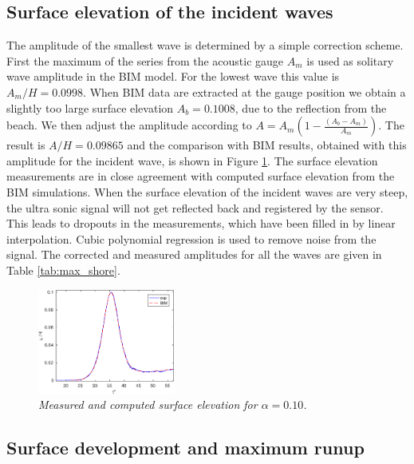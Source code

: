 \documentclass[review, authoryear]{elsarticle}
\begin{document}
\subsection{Surface elevation of the incident waves}
\label{surf_elev}
The amplitude of the smallest wave is determined by
a simple correction scheme. First the maximum of the series from the 
acoustic gauge $A_m$ is used as solitary wave amplitude in the BIM model.
For the lowest wave this value is $A_m/H=0.0998$.
When BIM data are extracted at the gauge position we obtain 
a slightly too large surface elevation $A_b=0.1008$, due to the reflection from 
the beach. We then adjust the amplitude 
according to $A=A_m (1- \frac{ (A_b-A_m)}{A_m})$. 
The result is $A/H=0.09865$ and the comparison with BIM results, obtained with this amplitude for the incident wave, is shown in Figure \ref{fig:surf_ele1}.
The surface elevation measurements are in close agreement with computed surface elevation from the BIM simulations. 
When the surface elevation of the incident waves are very steep, the ultra sonic signal will not get reflected back and registered by the sensor. 
This leads to dropouts in the measurements, which have been filled in by linear interpolation.  Cubic polynomial regression is used to remove noise from the signal.  The corrected and measured amplitudes for all the  waves are given in Table \ref{tab:max_shore}.



\begin{figure}
\centering
\includegraphics[width=0.4\textwidth]{./Figures/surf_ele10_2016_r.eps}
\caption{\textit{Measured and computed surface elevation for $\alpha=0.10$.}}
\label{fig:surf_ele1}
\end{figure}


\subsection{Surface development and maximum runup}
\label{max_run}
\end{document}
